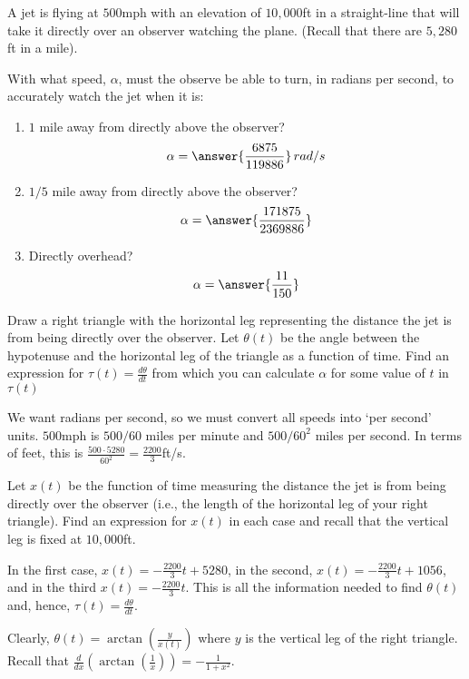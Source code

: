 \documentclass{ximera}
\author{Gregory Hartman \and Matthew Carr}
\begin{document}
\begin{exercise}




A jet is flying at $500$mph with an elevation of $10,000$ft in a straight-line that will take it directly over an observer watching the plane. (Recall that there are $5,280$ft in a mile).

With what speed, $\alpha$, must the observe be able to turn, in radians per second, to accurately watch the jet when it is:
\begin{enumerate}
\item		$1$ mile away from directly above the observer? \[\alpha=\answer{\frac{6875}{119886}}\,rad/s\]
\item		$1/5$ mile away from directly above the observer? \[\alpha=\answer{\frac{171875}{2369886}}\]
\item		Directly overhead? \[\alpha=\answer{\frac{11}{150}}\]
\end{enumerate}

\begin{hint}
Draw a right triangle with the horizontal leg representing the distance the jet is from being directly over the observer. Let $\theta(t)$ be the angle between the hypotenuse and the horizontal leg of the triangle as a function of time. Find an expression for $\tau(t)=\frac{d\theta}{dt}$ from which you can calculate $\alpha$ for some value of $t$ in $\tau(t)$
\end{hint}
\begin{hint}
We want radians per second, so we must convert all speeds into `per second' units. $500$mph is $500/{60}$ miles per minute and $500/{60^2}$ miles per second. In terms of feet, this is $\frac{500\cdot5280}{60^2}=\frac{2200}{3}$ft/s. 
\end{hint}
\begin{hint}
Let $x(t)$ be the function of time measuring the distance the jet is from being directly over the observer (i.e., the length of the horizontal leg of your right triangle). Find an expression for $x(t)$ in each case and recall that the vertical leg is fixed at $10,000$ft.
\end{hint}
\begin{hint}
In the first case, $x(t)=-\frac{2200}{3}t+5280$, in the second, $x(t)=-\frac{2200}{3}t+1056$, and in the third $x(t)=-\frac{2200}{3}t$. This is all the information needed to find $\theta(t)$ and, hence, $\tau(t)=\frac{d\theta}{dt}$.
\end{hint}
\begin{hint}
Clearly, $\theta(t)=\arctan(\frac{y}{x(t)})$ where $y$ is the vertical leg of the right triangle. Recall that $\frac{d}{dx}(\arctan(\frac{1}{x}))=-\frac{1}{1+x^2}$.


\end{hint}
\end{exercise}
\end{document}
